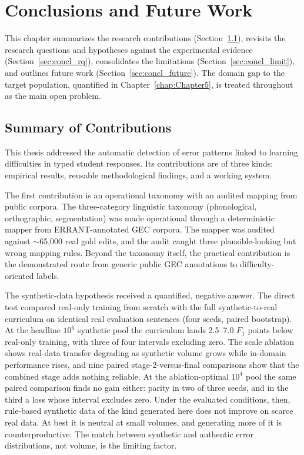 
\chapter{Conclusions and Future Work} %
\label{chap:Chapter6} %


This chapter summarizes the research contributions (Section~\ref{sec:concl_contrib}), revisits the research questions and hypotheses against the experimental evidence (Section~\ref{sec:concl_rq}), consolidates the limitations (Section~\ref{sec:concl_limit}), and outlines future work (Section~\ref{sec:concl_future}). The domain gap to the target population, quantified in Chapter~\ref{chap:Chapter5}, is treated throughout as the main open problem.

\section{Summary of Contributions}
\label{sec:concl_contrib}

This thesis addressed the automatic detection of error patterns linked to learning difficulties in typed student responses. Its contributions are of three kinds: empirical results, reusable methodological findings, and a working system.

The first contribution is an operational taxonomy with an audited mapping from public corpora. The three-category linguistic taxonomy (phonological, orthographic, segmentation) was made operational through a deterministic mapper from ERRANT-annotated GEC corpora. The mapper was audited against $\sim$65{,}000 real gold edits, and the audit caught three plausible-looking but wrong mapping rules. Beyond the taxonomy itself, the practical contribution is the demonstrated route from generic public GEC annotations to difficulty-oriented labels.

The synthetic-data hypothesis received a quantified, negative answer. The direct test compared real-only training from scratch with the full synthetic-to-real curriculum on identical real evaluation sentences (four seeds, paired bootstrap). At the headline $10^6$ synthetic pool the curriculum lands 2.5--7.0 $F_1$ points below real-only training, with three of four intervals excluding zero. The scale ablation shows real-data transfer degrading as synthetic volume grows while in-domain performance rises, and nine paired stage-2-versus-final comparisons show that the combined stage adds nothing reliable. At the ablation-optimal $10^4$ pool the same paired comparison finds no gain either: parity in two of three seeds, and in the third a loss whose interval excludes zero. Under the evaluated conditions, then, rule-based synthetic data of the kind generated here does not improve on scarce real data. At best it is neutral at small volumes, and generating more of it is counterproductive. The match between synthetic and authentic error distributions, not volume, is the limiting factor.

